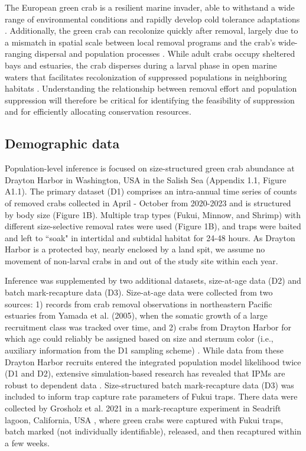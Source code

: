 \documentclass{article}
\begin{document}
The European green crab is a resilient marine invader, able to withstand a wide range of environmental conditions and rapidly develop cold tolerance adaptations \parencite{tepolt2020rapid}. Additionally, the green crab can recolonize quickly after removal, largely due to a mismatch in spatial scale between local removal programs and the crab’s wide-ranging dispersal and population processes \parencite{keller2025transition}. While adult crabs occupy sheltered bays and estuaries, the crab disperses during a larval phase in open marine waters that facilitates recolonization of suppressed populations in neighboring habitats \parencite{yamada2021ocean}. Understanding the relationship between removal effort and population suppression will therefore be critical for identifying the feasibility of suppression and for efficiently allocating conservation resources. 

\subsection{Demographic data}

Population-level inference is focused on size-structured green crab abundance at Drayton Harbor in Washington, USA in the Salish Sea (Appendix 1.1, Figure A1.1). The primary dataset (D1) comprises an intra-annual time series of counts of removed crabs collected in April - October from 2020-2023 and is structured by body size (Figure 1B). Multiple trap types (Fukui, Minnow, and Shrimp) with different size-selective removal rates were used (Figure 1B), and traps were baited and left to ``soak" in intertidal and subtidal habitat for 24-48 hours. As Drayton Harbor is a protected bay, nearly enclosed by a land spit, we assume no movement of non-larval crabs in and out of the study site within each year. 

Inference was supplemented by two additional datasets, size-at-age data (D2) and batch mark-recapture data (D3). Size-at-age data were collected from two sources: 1) records from crab removal observations in northeastern Pacific estuaries from Yamada et al. (2005), when the somatic growth of a large recruitment class was tracked over time, and 2) crabs from Drayton Harbor for which age could reliably be assigned based on size and sternum color (i.e., auxiliary information from the D1 sampling scheme) \parencite{yamada2005growth}. While data from these Drayton Harbor recruits entered the integrated population model likelihood twice (D1 and D2), extensive simulation-based research has revealed that IPMs are robust to dependent data \parencite{abadi2010assessment}. Size-structured batch mark-recapture data (D3) was included to inform trap capture rate parameters of Fukui traps. There data were collected by Grosholz et al. 2021 in a mark-recapture experiment in Seadrift lagoon, California, USA \parencite{grosholz2021stage}, where green crabs were captured with Fukui traps, batch marked (not individually identifiable), released, and then recaptured within a few weeks. 
\end{document}
